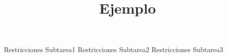 \documentclass{oci}
\title{Ejemplo}
\begin{document}
\begin{problemDescription}
\lipsum[1-3]
\end{problemDescription}

\begin{inputDescription}
\lipsum[1]
\end{inputDescription}

\begin{outputDescription}
\lipsum[1]
\end{outputDescription}

\begin{scoreDescription}
   Restricciones Subtarea1
   Restricciones Subtarea2
   Restricciones Subtarea3
\end{scoreDescription}

\begin{sampleDescription}
\end{sampleDescription}
\end{document}
